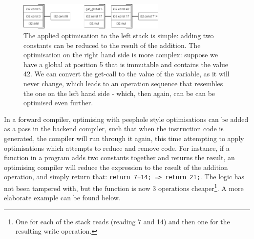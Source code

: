 \documentclass[a4paper]{article}
\begin{document}
\begin{figure}[H]
	\includegraphics[width=0.65\textwidth]{PeepholeOptimisationIllustrations}
	\centering
	\caption{The applied optimisation to the left stack is simple: adding two constants can be reduced to the result of the addition. The optimisation on the right hand side is more complex: suppose we have a global at position 5 that is immutable and contains the value 42. We can convert the get-call to the value of the variable, as it will never change, which leads to an operation sequence that resembles the one on the left hand side - which, then again, can be can be optimised even further.}
\end{figure}

In a forward compiler, optimising with peephole style optimisations can be added as a pass in the backend compiler, such that when the instruction code is generated, the compiler will run through it again, this time attempting to apply optimisations which attempts to reduce and remove code. For instance, if a function in a program adds two constants together and returns the result, an optimising compiler will reduce the expression to the result of the addition operation, and simply return that: \texttt{return 7+14; => return 21;}. The logic has not been tampered with, but the function is now 3 operations cheaper\footnote{One for each of the stack reads (reading 7 and 14) and then one for the resulting write operation.}. A more elaborate example can be found below.
\end{document}
